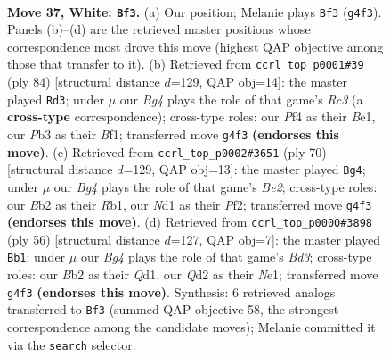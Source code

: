 \documentclass[11pt]{article}
\begin{document}
\clearpage

\begin{figure}[p]\centering
\begin{subfigure}{0.46\textwidth}\centering
\resizebox{\linewidth}{!}{%
\newchessgame
\chessboard[
  setfen={1n1qkb1r/4n3/r1p3p1/3p2P1/3P1PBp/1P5P/1B1Q3R/2RN1K2 w - - 3 37},
  showmover=false,
  pgfstyle=straightmove, color=movearrow, markmove={g4-f3}
]}
\caption{}
\end{subfigure}\hfill
\begin{subfigure}{0.46\textwidth}\centering
\resizebox{\linewidth}{!}{%
\newchessgame
\chessboard[
  setfen={r2q4/3r1pk1/P4n2/4pP1p/4PbpP/2R5/4Q3/R3BB1K w - - 5 43},
  showmover=false,
  pgfstyle=straightmove, color=movearrow, markmove={c3-d3}
]}
\caption{}
\end{subfigure}
\\[4pt]
\begin{subfigure}{0.46\textwidth}\centering
\resizebox{\linewidth}{!}{%
\newchessgame
\chessboard[
  setfen={rr2bk2/1p1nqpp1/2p4p/P3p3/4P3/1NP1Q2P/4BPPK/1R1R4 w - - 14 36},
  showmover=false,
  pgfstyle=straightmove, color=movearrow, markmove={e2-g4}
]}
\caption{}
\end{subfigure}\hfill
\begin{subfigure}{0.46\textwidth}\centering
\resizebox{\linewidth}{!}{%
\newchessgame
\chessboard[
  setfen={2r3k1/3b3p/2nqpp2/pp1p3P/3n1PP1/3BB3/PP3R2/3QN1K1 w - - 4 29},
  showmover=false,
  pgfstyle=straightmove, color=movearrow, markmove={d3-b1}
]}
\caption{}
\end{subfigure}
\caption{\textbf{Move 37, White: \texttt{Bf3}.} (a) Our position; Melanie plays \texttt{Bf3} (\texttt{g4f3}). Panels (b)--(d) are the retrieved master positions whose correspondence most drove this move (highest QAP objective among those that transfer to it). (b) Retrieved from \texttt{ccrl\_top\_p0001\#39} (ply 84) [structural distance $d$=129, QAP obj=14]: the master played \texttt{Rd3}; under $\mu$ our \emph{Bg4} plays the role of that game's \emph{Rc3} (a \textbf{cross-type} correspondence); cross-type roles: our \emph{P}f4 as their \emph{B}e1, our \emph{P}b3 as their \emph{B}f1; transferred move \texttt{g4f3} \textbf{(endorses this move)}. (c) Retrieved from \texttt{ccrl\_top\_p0002\#3651} (ply 70) [structural distance $d$=129, QAP obj=13]: the master played \texttt{Bg4}; under $\mu$ our \emph{Bg4} plays the role of that game's \emph{Be2}; cross-type roles: our \emph{B}b2 as their \emph{R}b1, our \emph{N}d1 as their \emph{P}f2; transferred move \texttt{g4f3} \textbf{(endorses this move)}. (d) Retrieved from \texttt{ccrl\_top\_p0000\#3898} (ply 56) [structural distance $d$=127, QAP obj=7]: the master played \texttt{Bb1}; under $\mu$ our \emph{Bg4} plays the role of that game's \emph{Bd3}; cross-type roles: our \emph{B}b2 as their \emph{Q}d1, our \emph{Q}d2 as their \emph{N}e1; transferred move \texttt{g4f3} \textbf{(endorses this move)}. Synthesis: 6 retrieved analogs transferred to \texttt{Bf3} (summed QAP objective 58, the strongest correspondence among the candidate moves); Melanie committed it via the \texttt{search} selector.}
\label{fig:thought-m72}
\end{figure}
\end{document}
